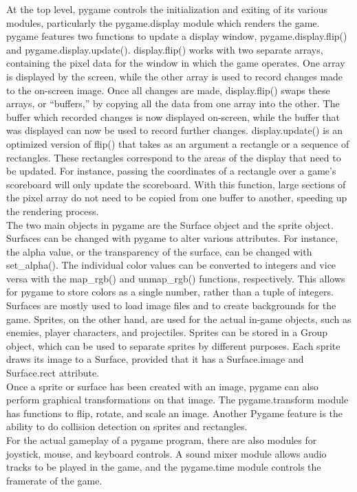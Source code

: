 At the top level, pygame controls the initialization and exiting of its various modules, particularly the pygame.display module which renders the game. pygame features two functions to update a display window, pygame.display.flip() and pygame.display.update(). display.flip() works with two separate arrays, containing the pixel data for the window in which the game operates. One array is displayed by the screen, while the other array is used to record changes made to the on-screen image. Once all changes are made, display.flip() swaps these arrays, or ``buffers,'' by copying all the data from one array into the other. The buffer which recorded changes is now displayed on-screen, while the buffer that was displayed can now be used to record further changes. display.update() is an optimized version of flip() that takes as an argument a rectangle or a sequence of rectangles. These rectangles correspond to the areas of the display that need to be updated. For instance, passing the coordinates of a rectangle over a game's scoreboard will only update the scoreboard. With this function, large sections of the pixel array do not need to be copied from one buffer to another, speeding up the rendering process.\\

The two main objects in pygame are the Surface object and the sprite object. Surfaces can be changed with pygame to alter various attributes. For instance, the alpha value, or the transparency of the surface, can be changed with set_alpha(). The individual color values can be converted to integers and vice versa with the map_rgb() and unmap_rgb() functions, respectively. This allows for pygame to store colors as a single number, rather than a tuple of integers. Surfaces are mostly used to load image files and to create backgrounds for the game. Sprites, on the other hand, are used for the actual in-game objects, such as enemies, player characters, and projectiles. Sprites can be stored in a Group object, which can be used to separate sprites by different purposes. Each sprite draws its image to a Surface, provided that it has a Surface.image and Surface.rect attribute.\\

Once a sprite or surface has been created with an image, pygame can also perform graphical transformations on that image. The pygame.transform module has functions to flip, rotate, and scale an image. Another Pygame feature is the ability to do collision detection on sprites and rectangles.\\

For the actual gameplay of a pygame program, there are also modules for joystick, mouse, and keyboard controls. A sound mixer module allows audio tracks to be played in the game, and the pygame.time module controls the framerate of the game.